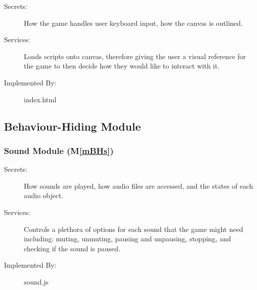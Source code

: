\documentclass[12pt, titlepage]{article}
\newcommand{\mref}[1]{M\ref{#1}}
\begin{document}

\begin{description}
\item[Secrets:]How the game handles user keyboard input, how the canvas is outlined.
\item[Services:] Loads scripts onto canvas, therefore giving the user a visual reference for the game to then decide how they would like to interact with it.
\item[Implemented By:] index.html
\end{description}

\subsection{Behaviour-Hiding Module}


\subsubsection{Sound Module (\mref{mBHs})}
\begin{description}
\item[Secrets:] How sounds are played, how audio files are accessed, and the states of each audio object.
\item[Services:] Controls a plethora of options for each sound that the game might need including: muting, unmuting, pausing and unpausing, stopping, and checking if the sound is paused.
\item[Implemented By:] sound.js
\end{description}
\end{document}
